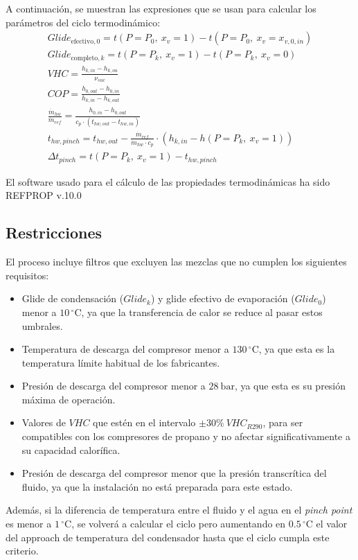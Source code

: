 \documentclass[../main.tex]{subfiles}
\begin{document}
A continuación, se muestran las expresiones que se usan para calcular los parámetros del ciclo termodinámico:
\begin{gather}
Glide_{\text{efectivo},0}=t(P = P_{0},\ x_{v} = 1) - t(P = P_{0},\ x_{v} = x_{v,0,in})
\label{eq:glide_O}
\\
Glide_{\text{completo},k}=t(P = P_{k},\ x_{v} = 1) - t(P = P_{k},\ x_{v} = 0)
\label{eq:glide_k}
\\
VHC = \frac{h_{k,in} - h_{k,ou}}{\nu_{suc}}
\label{eq:VHC}
\\
COP = \frac{h_{0,out}-h_{0,in}}{h_{k,in}-h_{k,out}}
\label{eq:COP}
\\
\frac{\dot{m}_{hw}}{\dot{m}_{ref}}=\frac{h_{0,in}-h_{0,out}}
{c_{p}\cdot \left( t_{hw,out}-t_{hw,in} \right)}
\label{eq:caudales}
\\
t_{hw,pinch} = t_{hw,out} - \frac{\dot{m}_{ref}}{\dot{m}_{hw}\cdot c_{p}} \cdot 
\left( h_{k,in} - h(P = P_{k},\ x_{v} = 1)\right)
\label{eq:t_hw_pinch}
\\
\Delta t_{pinch} = t(P = P_{k},\ x_{v} = 1) - t_{hw,pinch}
\label{t_pinch}
\end{gather}

El software usado para el cálculo de las propiedades termodinámicas ha sido REFPROP v.10.0 \cite{refprop}

\newpage


\subsection{Restricciones}
\label{subsec:restricciones}
El proceso incluye filtros que excluyen las mezclas que no cumplen los siguientes requisitos:
\begin{itemize}
    \item Glide de condensación ($Glide_{k}$) y glide efectivo de evaporación 
    ($Glide_{0}$) menor a $10\,^{\circ}\mathrm{C}$, ya que la transferencia de 
    calor se reduce al pasar estos umbrales.
    \item Temperatura de descarga del compresor menor a $130\,^{\circ}\mathrm{C}$,
    ya que esta es la temperatura límite habitual de los fabricantes.
    \item Presión de descarga del compresor menor a $28\ \mathrm{bar}$, ya que esta es
    su presión máxima de operación.
    \item Valores de $VHC$ que estén en el intervalo $\pm 30\%\ VHC_{R290}$,  
    para ser compatibles con los compresores de propano y no afectar significativamente a su capacidad calorífica.
    \item Presión de descarga del compresor menor que la presión transcrítica del fluido, ya que la instalación no está preparada para este estado.
\end{itemize}
Además, si la diferencia de temperatura entre el fluido y el agua en el \textit{pinch point} es menor a $1\,^{\circ}\mathrm{C}$, se volverá a calcular el ciclo pero aumentando en $0.5\,^{\circ}\mathrm{C}$ el valor del approach de temperatura del condensador hasta que el ciclo cumpla este criterio.
\end{document}
